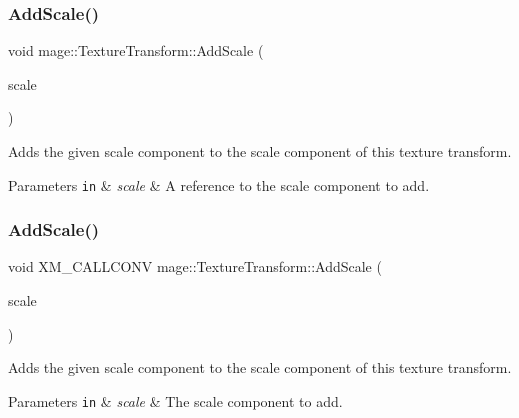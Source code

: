 \subsubsection{\texorpdfstring{Add\+Scale()}{AddScale()}\hspace{0.1cm}{\footnotesize\ttfamily [3/4]}}
{\footnotesize\ttfamily void mage\+::\+Texture\+Transform\+::\+Add\+Scale (\begin{DoxyParamCaption}\item[{const \mbox{\hyperlink{namespacemage_aee4759dedc8def6c6dec26b5c7eddf29}{F32x2}} \&}]{scale }\end{DoxyParamCaption})\hspace{0.3cm}{\ttfamily [noexcept]}}

Adds the given scale component to the scale component of this texture transform.


\begin{DoxyParams}[1]{Parameters}
\mbox{\tt in}  & {\em scale} & A reference to the scale component to add. \\
\hline
\end{DoxyParams}
\mbox{\label{classmage_1_1_texture_transform_a6fa7617e33c123fd09b9f1c7e06afaa1}} 
\subsubsection{\texorpdfstring{Add\+Scale()}{AddScale()}\hspace{0.1cm}{\footnotesize\ttfamily [4/4]}}
{\footnotesize\ttfamily void X\+M\+\_\+\+C\+A\+L\+L\+C\+O\+NV mage\+::\+Texture\+Transform\+::\+Add\+Scale (\begin{DoxyParamCaption}\item[{F\+X\+M\+V\+E\+C\+T\+OR}]{scale }\end{DoxyParamCaption})\hspace{0.3cm}{\ttfamily [noexcept]}}

Adds the given scale component to the scale component of this texture transform.


\begin{DoxyParams}[1]{Parameters}
\mbox{\tt in}  & {\em scale} & The scale component to add. \\
\hline
\end{DoxyParams}
\mbox{\label{classmage_1_1_texture_transform_a6b15e635a3210008086786c274233acb}} 
